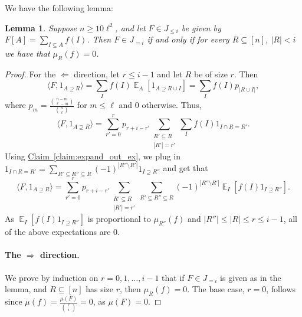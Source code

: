 \documentclass[11pt]{article}
\newcommand{\expref}[2]{\texorpdfstring{\hyperref[#2]{#1~\ref{#2}}}{#1~\ref{#2}}}
\newtheorem{lemma}[theorem]{Lemma}
\newcommand\card[1]{\left| {#1} \right|}
\newcommand\Expect[2]{{\mathop{\mathbb{E}}_{#1}\left[ {#2} \right]}}
\newcommand\inner[2]{\langle{#1},{#2}\rangle}
\renewcommand\geq{\geqslant}
\renewcommand\leq{\leqslant}
\begin{document}
We have the following lemma:
\begin{lemma}\label{lem:purp_cond}
Suppose $n\geq 10\ell^2$, and let $F\in J_{\leq i}$ be given by $F[A] = \sum\limits_{I\subseteq A} f(I)$.
Then $F\in J_{=i}$ if and only if for every $R\subseteq [n]$, $\card{R}<i$ we %
have that $\mu_R (f)=0$.
\end{lemma}
\begin{proof}
For the $\Leftarrow$ direction, let $r\leq i-1$ and let $R$ be of size $r$. Then
\[
\inner{F}{1_{A\supseteq R}}
=\sum\limits_{I}f(I) \Expect{A}{1_{A\supseteq R\cup I}}
=\sum\limits_{I}f(I) p_{\card{R\cup I}},
\]
where $p_{m} = \frac{\binom{n-m}{\ell - m}}{\binom{n}{\ell}}$ for $m\leq \ell$ and $0$ otherwise. Thus,
\[
\inner{F}{1_{A\supseteq R}} = \sum\limits_{r'=0}^{r}p_{r+i-r'}\sum\limits_{\substack{R'\subseteq R\\ \card{R'} = r'}} \sum\limits_{I} f(I)1_{I\cap R = R'}.
\]
Using \expref{Claim}{claim:expand_out_ex}, we plug in $1_{I\cap R = R'} = \sum\limits_{R'\subseteq R''\subseteq R}(-1)^{\card{R''\setminus R'}} 1_{I\supseteq R''}$
and get that
\[
\inner{F}{1_{A\supseteq R}} =
\sum\limits_{r'=0}^{r}p_{r+i-r'}\sum\limits_{\substack{R'\subseteq R\\ \card{R'} = r'}}
\sum\limits_{R'\subseteq R''\subseteq R} (-1)^{\card{R''\setminus R'}} \Expect{I}{f(I) 1_{I\supseteq R''}}.
\]
As $\Expect{I}{f(I) 1_{I\supseteq R''}}$ is proportional to $\mu_{R''}(f)$ and $\card{R''}\leq \card{R}\leq r\leq i-1$, all of the above expectations are $0$.

\paragraph{The $\Rightarrow$ direction.} We prove by induction on $r=0,1,\ldots,i-1$
that if $F\in J_{=i}$ is given as in the lemma, and $R\subseteq [n]$ has size $r$, then $\mu_R(f) = 0$.
The base case, $r=0$, follows since $\mu(f) = \frac{\mu(F)}{{\ell\choose i}} = 0$, as $\mu(F) = 0$.


\end{proof}
\end{document}
